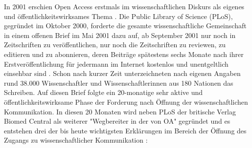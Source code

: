 In 2001 erschien Open Access erstmals im wissenschaftlichen Diskurs als eigenes und öffentlichkeitswirksames Thema \cite{cite:19}. Die Public Library of Science (PLoS), gegründet im Oktober 2000, forderte die gesamte wissenschaftliche Gemeinschaft in einem offenen Brief im Mai 2001 dazu auf, ab September 2001 nur noch in Zeitschriften zu veröffentlichen, nur noch die Zeitschriften zu reviewen, zu editieren und zu abonnieren, deren Beiträge spätestens sechs Monate nach ihrer Erstveröffentlichung für jedermann im Internet kostenlos und unentgeltlich einsehbar sind \cite{cite:20}. Schon nach kurzer Zeit unterzeichneten nach eigenen Angaben \cite{cite:19a} rund 38.000 Wissenschaftler und Wissenschaftlerinnen aus 180 Nationen das Schreiben. Auf diesen Brief folgte ein 20-monatige sehr aktive und öffentlichkeitswirksame Phase der Forderung nach Öffnung der wissenschaftlichen Kommunikation. In diesen 20 Monaten wird neben PLoS der britische Verlag Biomed Central als weiterer "Wegbereiter in der von OA" \cite{suchen-Hoffmann-Zugang-undVerwertung-oeffentlicher-Informationen} gegründet und es entstehen drei der bis heute wichtigsten Erklärungen im Bereich der Öffnung des Zugangs zu wissenschaftlicher Kommunikation \cite{CREATe_2014}:
